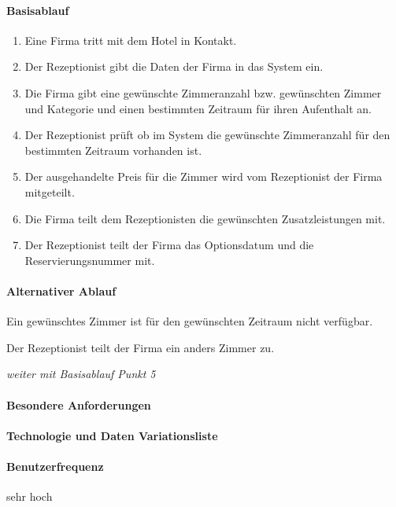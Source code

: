 \paragraph{Basisablauf}
\begin{enumerate}
	\item Eine Firma tritt mit dem Hotel in Kontakt.
	\item Der \Gls{Rezeptionist} gibt die Daten der Firma in das System ein.
	\item Die Firma gibt eine gewünschte Zimmeranzahl bzw. gewünschten Zimmer und Kategorie und einen bestimmten Zeitraum für ihren Aufenthalt an. 
    \item Der \Gls{Rezeptionist} prüft ob im System die gewünschte Zimmeranzahl für den bestimmten Zeitraum vorhanden ist. 
	\item Der ausgehandelte Preis für die \Gls{Zimmer} wird vom \Gls{Rezeptionist} der Firma mitgeteilt.
	\item Die Firma teilt dem \Gls{Rezeptionist}en die gewünschten Zusatzleistungen mit.
	\item Der \Gls{Rezeptionist} teilt der Firma das Optionsdatum und die Reservierungsnummer mit.
\end{enumerate}

\paragraph{Alternativer Ablauf}
\begin{longenum}
	\item
	\item
	\item
	\item
	\begin{longenum}
		\item Ein gewünschtes \Gls{Zimmer} ist für den gewünschten Zeitraum nicht verfügbar.
		\begin{longenum}
			\item Der \Gls{Rezeptionist} teilt der Firma ein anders \Gls{Zimmer} zu.
			\item \emph{weiter mit Basisablauf Punkt 5}
		\end{longenum}
	\end{longenum}
	\item
	\item
	\item
\end{longenum}

\paragraph{Besondere Anforderungen}

\paragraph{Technologie und Daten Variationsliste}

\paragraph{Benutzerfrequenz}
sehr hoch

\newpage

